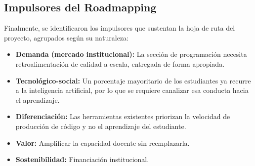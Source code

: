 \documentclass[letterpaper, 10 pt, conference]{ieeeconf}
\begin{document}
\subsection{Impulsores del Roadmapping}
Finalmente, se identificaron los impulsores que sustentan la hoja de ruta del proyecto, agrupados según su naturaleza:

\begin{itemize}
	\item \textbf{Demanda (mercado institucional):} La sección de programación necesita retroalimentación de calidad a escala, entregada de forma apropiada.
	\item \textbf{Tecnológico-social:} Un porcentaje mayoritario de los estudiantes ya recurre a la inteligencia artificial, por lo que se requiere canalizar esa conducta hacia el aprendizaje.
	\item \textbf{Diferenciación:} Las herramientas existentes priorizan la velocidad de producción de código y no el aprendizaje del estudiante.
	\item \textbf{Valor:} Amplificar la capacidad docente sin reemplazarla.
	\item \textbf{Sostenibilidad:} Financiación institucional.
\end{itemize}


\addtolength{\textheight}{-12cm}   %







\end{document}
